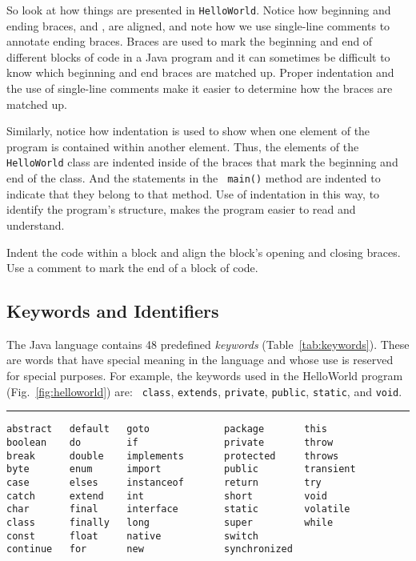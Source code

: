 So look at how things are presented in {\tt HelloWorld}. Notice how
beginning and ending braces, { and }, are aligned, and
note how we use single-line comments to annotate ending braces. Braces
are used to mark the beginning and end of different blocks of code in
a Java program and it can sometimes be difficult to know which
beginning and end braces are matched up. Proper indentation and the
use of single-line comments make it easier to determine how the braces
are matched up.

Similarly, notice how indentation is used to show when one element of
the program is contained within another element. Thus, the elements of
the {\tt HelloWorld} class are indented inside of the braces that mark
the beginning and end of the class. And the statements in the {\tt
main()} method are indented to indicate that they belong to that
method.  Use of indentation in this way, to identify the program's
structure, makes the program easier to read and understand.

{Indent the code within a block and align the block's opening and closing
braces.  Use a comment to mark the end of a block of code.}

\subsection{Keywords and Identifiers}
\label{subsec:keywords}

\noindent The Java language contains 48 predefined {\it keywords} (Table~\ref{tab:keywords}).
These are words that have special meaning in the language and whose
use is reserved for special purposes. For example, the keywords used
in the HelloWorld program (Fig.~\ref{fig:helloworld}) are: {\tt
class}, {\tt extends}, {\tt private}, {\tt public}, {\tt static}, and
{\tt void}. 

\begin{table}[htb]
{\caption{Java keywords.\label{tab:keywords}}}
{\color{cyan}\rule{27pc}{1pt}}\par\vspace{-10pt}
\begin{verbatim}
abstract   default   goto             package       this
boolean    do        if               private       throw
break      double    implements       protected     throws
byte       enum      import           public        transient
case       elses     instanceof       return        try
catch      extend    int              short         void
char       final     interface        static        volatile
class      finally   long             super         while
const      float     native           switch
continue   for       new              synchronized
\end{verbatim}
\par\vspace{-14pt}{\color{cyan}\rule{27pc}{1pt}}
\endTB
\end{table}

